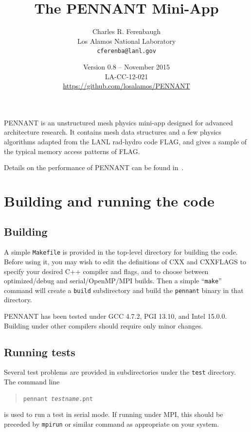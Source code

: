 \documentclass[11pt,letterpaper]{article}
\begin{document}
\title{The PENNANT Mini-App}
\author{Charles R. Ferenbaugh \\
        Los Alamos National Laboratory \\
        {\tt cferenba@lanl.gov}}
\date{Version 0.8 -- November 2015 \\
      LA-CC-12-021 \\
      \url{https://github.com/losalamos/PENNANT}}
\maketitle

PENNANT is an unstructured mesh physics mini-app designed for advanced
architecture research.
It contains mesh data structures and a few physics algorithms adapted
from the LANL rad-hydro code FLAG, and gives a
sample of the typical memory access patterns of FLAG.

Details on the performance of PENNANT can be found in~\cite{pnt1,pnt2}.


\section{Building and running the code}

\subsection{Building}

A simple {\tt Makefile} is provided in the top-level directory for building
the code.  Before using it, you may wish to edit the definitions of CXX
and CXXFLAGS to specify your desired C++ compiler and flags, and to
choose between optimized/debug and serial/OpenMP/MPI builds.  Then
a simple ``{\tt make}'' command will create a {\tt build} subdirectory and
build the {\tt pennant} binary in that directory.

PENNANT has been tested under GCC 4.7.2, PGI 13.10, and Intel 15.0.0.
Building under other compilers should require only minor changes.

\subsection{Running tests}

Several test problems are provided in subdirectories under the {\tt test}
directory.  The command line
\begin{quote}
{\tt pennant \emph{testname}.pnt}
\end{quote}
is used to run a test in serial mode.  If running under MPI, this should
be preceded by {\tt mpirun} or similar command as appropriate on your
system.
\end{document}

